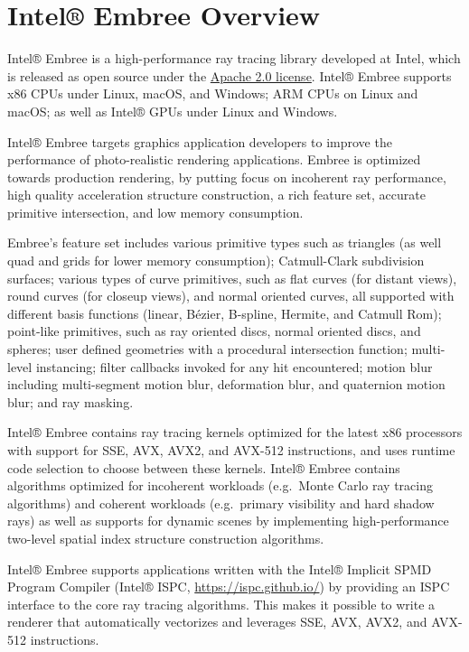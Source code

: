 \chapter{Intel® Embree Overview}\label{intel-embree-overview}

Intel® Embree is a high-performance ray tracing library developed at
Intel, which is released as open source under the
\href{http://www.apache.org/licenses/LICENSE-2.0}{Apache 2.0 license}.
Intel® Embree supports x86 CPUs under Linux, macOS, and Windows; ARM
CPUs on Linux and macOS; as well as Intel® GPUs under Linux and Windows.

Intel® Embree targets graphics application developers to improve the
performance of photo-realistic rendering applications. Embree is
optimized towards production rendering, by putting focus on incoherent
ray performance, high quality acceleration structure construction, a
rich feature set, accurate primitive intersection, and low memory
consumption.

Embree's feature set includes various primitive types such as triangles
(as well quad and grids for lower memory consumption); Catmull-Clark
subdivision surfaces; various types of curve primitives, such as flat
curves (for distant views), round curves (for closeup views), and normal
oriented curves, all supported with different basis functions (linear,
Bézier, B-spline, Hermite, and Catmull Rom); point-like primitives, such
as ray oriented discs, normal oriented discs, and spheres; user defined
geometries with a procedural intersection function; multi-level
instancing; filter callbacks invoked for any hit encountered; motion
blur including multi-segment motion blur, deformation blur, and
quaternion motion blur; and ray masking.

Intel® Embree contains ray tracing kernels optimized for the latest x86
processors with support for SSE, AVX, AVX2, and AVX-512 instructions,
and uses runtime code selection to choose between these kernels. Intel®
Embree contains algorithms optimized for incoherent workloads
(e.g.~Monte Carlo ray tracing algorithms) and coherent workloads
(e.g.~primary visibility and hard shadow rays) as well as supports for
dynamic scenes by implementing high-performance two-level spatial index
structure construction algorithms.

Intel® Embree supports applications written with the Intel® Implicit
SPMD Program Compiler (Intel® ISPC, \url{https://ispc.github.io/}) by
providing an ISPC interface to the core ray tracing algorithms. This
makes it possible to write a renderer that automatically vectorizes and
leverages SSE, AVX, AVX2, and AVX-512 instructions.

